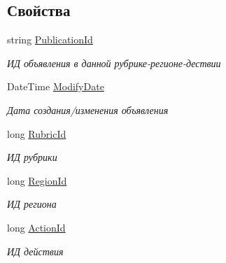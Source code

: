 \subsection*{Свойства}
\begin{DoxyCompactItemize}
\item 
string \hyperlink{class_r_t_1_1_parsing_libs_1_1_models_1_1_web_publication_ae9aa1c3f6b51812ca50dd0b389927a6a}{Publication\+Id}
\begin{DoxyCompactList}\small\item\em ИД объявления в данной рубрике-\/регионе-\/дествии \end{DoxyCompactList}\item 
Date\+Time \hyperlink{class_r_t_1_1_parsing_libs_1_1_models_1_1_web_publication_a34bc37b2cb2fdec3aa98c2a9dc934821}{Modify\+Date}
\begin{DoxyCompactList}\small\item\em Дата создания/изменения объявления \end{DoxyCompactList}\item 
long \hyperlink{class_r_t_1_1_parsing_libs_1_1_models_1_1_web_publication_a08cca4867a7785ad2c65ea69d912b8fb}{Rubric\+Id}
\begin{DoxyCompactList}\small\item\em ИД рубрики \end{DoxyCompactList}\item 
long \hyperlink{class_r_t_1_1_parsing_libs_1_1_models_1_1_web_publication_ac617cee04f4c38b132e27c19d375bf54}{Region\+Id}
\begin{DoxyCompactList}\small\item\em ИД региона \end{DoxyCompactList}\item 
long \hyperlink{class_r_t_1_1_parsing_libs_1_1_models_1_1_web_publication_ae9b9c8570cb37cfe1941bdcf13a723f6}{Action\+Id}
\begin{DoxyCompactList}\small\item\em ИД действия \end{DoxyCompactList}\item 

\end{DoxyCompactItemize}
